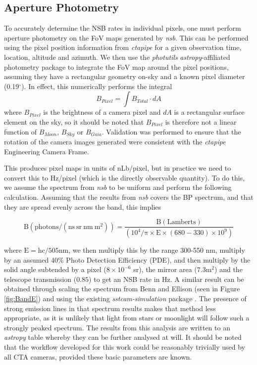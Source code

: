 \subsection{Aperture Photometry}
To accurately determine the NSB rates in individual pixels, one must perform aperture photometry on the FoV maps generated by \textit{nsb}. This can be performed using the pixel position information from \textit{ctapipe} \cite{ctapipe2} for a given observation time, location, altitude and azimuth. We then use the \textit{photutils} \textit{astropy}-affiliated \cite{astropy:2018} photometry package \cite{photutils} to integrate the FoV map around the pixel positions, assuming they have a rectangular geometry on-sky and a known pixel diameter (0.19$^{\circ}$). In effect, this numerically performs the integral
\begin{equation}
    B_{Pixel}=\int B_{Total} \cdot dA
\end{equation}
where $B_{Pixel}$ is the brightness of a camera pixel and $dA$ is a rectangular surface element on the sky, so it should be noted that $B_{Pixel}$ is therefore not a linear function of $B_{Moon}$, $B_{Sky}$ or $B_{Gaia}$. Validation was performed to ensure that the rotation of the camera images generated were consistent with the \textit{ctapipe} Engineering Camera Frame.

This produces pixel maps in units of nLb/pixel, but in practice we need to convert this to Hz/pixel (which is the directly observable quantity). To do this, we assume the spectrum from \textit{nsb} to be uniform and perform the following calculation. Assuming that the results from \textit{nsb} covers the BP spectrum, and that they are spread evenly across the band, this implies

\begin{equation}
    \mathrm{B (photons/(ns\ sr\ nm\ m^2) )=\frac{B (Lamberts)}{(10^4 / \pi \times E \times (680-330) \times 10^9)}}
\end{equation}

where $\mathrm{E=hc/505nm}$, we then multiply this by the range 300-550 nm, multiply by an assumed 40\% Photo Detection Efficiency (PDE), and then multiply by the solid angle subtended by a pixel ($8\times 10^{-6}$ sr), the mirror area ($7.3 \mathrm{m^2}$) and the telescope transmission ($0.85$) to get an NSB rate in Hz. A similar result can be obtained through scaling the spectrum from Benn and Ellison \cite{BandE} (seen in Figure \ref{fig:BandE}) and using the existing \textit{sstcam-simulation} package \cite{sstcamsimulation}. The presence of strong emission lines in that spectrum results makes that method less appropriate, as it is unlikely that light from stars or moonlight will follow such a strongly peaked spectrum. The results from this analysis are written to an \textit{astropy} table whereby they can be further analysed at will. It should be noted that the workflow developed for this work could be reasonably trivially used by all CTA cameras, provided these basic parameters are known.

